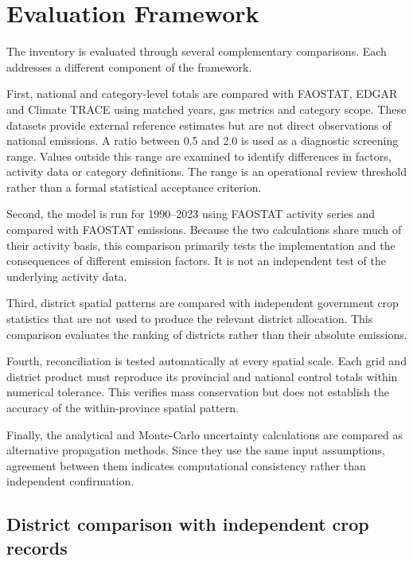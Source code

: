 \section{Evaluation Framework}
\label{sec:validation}

The inventory is evaluated through several complementary comparisons. Each addresses a
different component of the framework.

First, national and category-level totals are compared with FAOSTAT, EDGAR and Climate TRACE
using matched years, gas metrics and category scope. These datasets provide external
reference estimates but are not direct observations of national emissions. A ratio between
0.5 and 2.0 is used as a diagnostic screening range. Values outside this range are examined
to identify differences in factors, activity data or category definitions. The range is an
operational review threshold rather than a formal statistical acceptance criterion.

Second, the model is run for 1990--2023 using FAOSTAT activity series and compared with
FAOSTAT emissions. Because the two calculations share much of their activity basis, this
comparison primarily tests the implementation and the consequences of different emission
factors. It is not an independent test of the underlying activity data.

Third, district spatial patterns are compared with independent government crop statistics
that are not used to produce the relevant district allocation. This comparison evaluates the
ranking of districts rather than their absolute emissions.

Fourth, reconciliation is tested automatically at every spatial scale. Each grid and district
product must reproduce its provincial and national control totals within numerical
tolerance. This verifies mass conservation but does not establish the accuracy of the
within-province spatial pattern.

Finally, the analytical and Monte-Carlo uncertainty calculations are compared as alternative
propagation methods. Since they use the same input assumptions, agreement between them
indicates computational consistency rather than independent confirmation.

\subsection{District comparison with independent crop records}
\label{sec:validation-district}

